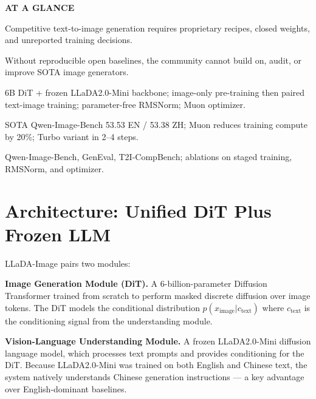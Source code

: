 \documentclass[10pt,twocolumn]{article}
\begin{document}
\begin{mdframed}[backgroundcolor=boxgray,linecolor=rulered,linewidth=1pt,
    innerleftmargin=6pt,innerrightmargin=6pt,
    innertopmargin=6pt,innerbottommargin=6pt]
\textbf{\small AT A GLANCE}\par\vspace{4pt}
\begin{description}[leftmargin=0pt,labelsep=4pt,itemsep=2pt,parsep=0pt,
    font=\small\bfseries]
  \item[Problem:] Competitive text-to-image generation requires
    proprietary recipes, closed weights, and unreported training
    decisions.
  \item[Why it matters:] Without reproducible open baselines, the
    community cannot build on, audit, or improve SOTA image generators.
  \item[Method:] 6B DiT + frozen LLaDA2.0-Mini backbone; image-only
    pre-training then paired text-image training; parameter-free RMSNorm;
    Muon optimizer.
  \item[Result:] SOTA Qwen-Image-Bench 53.53 EN / 53.38 ZH; Muon
    reduces training compute by 20\%; Turbo variant in 2--4 steps.
  \item[Evidence:] Qwen-Image-Bench, GenEval, T2I-CompBench; ablations
    on staged training, RMSNorm, and optimizer.
\end{description}
\end{mdframed}

\section{Architecture: Unified DiT Plus Frozen LLM}

LLaDA-Image pairs two modules:

\textbf{Image Generation Module (DiT).} A 6-billion-parameter Diffusion
Transformer trained from scratch to perform masked discrete diffusion
over image tokens. The DiT models the conditional distribution
$p(x_{\text{image}} | c_{\text{text}})$ where $c_{\text{text}}$ is the
conditioning signal from the understanding module.

\textbf{Vision-Language Understanding Module.} A frozen LLaDA2.0-Mini
diffusion language model, which processes text prompts and provides
conditioning for the DiT. Because LLaDA2.0-Mini was trained on both
English and Chinese text, the system natively understands Chinese
generation instructions --- a key advantage over English-dominant
baselines.
\end{document}
